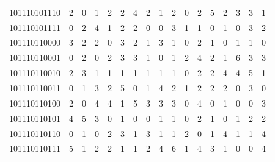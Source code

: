 \documentclass[10pt,a4paper]{article}
\begin{document}
\begin{longtable}{ |c|c|c|c|c|c|c|c|c|c|c|c|c|c|c|c|c| }
    101110101110              & 2                            & 0                                & 1                            & 2                              & 2   & 4   & 2   & 1   & 2   & 0   & 2   & 5   & 2   & 3   & 3   & 1   \\
    101110101111              & 0                            & 2                                & 4                            & 1                              & 2   & 2   & 0   & 0   & 3   & 1   & 1   & 0   & 1   & 0   & 3   & 2   \\
    101110110000              & 3                            & 2                                & 2                            & 0                              & 3   & 2   & 1   & 3   & 1   & 0   & 2   & 1   & 0   & 1   & 1   & 0   \\
    101110110001              & 0                            & 2                                & 0                            & 2                              & 3   & 3   & 1   & 0   & 1   & 2   & 4   & 2   & 1   & 6   & 3   & 3   \\
    101110110010              & 2                            & 3                                & 1                            & 1                              & 1   & 1   & 1   & 1   & 1   & 0   & 2   & 2   & 4   & 4   & 5   & 1   \\
    101110110011              & 0                            & 1                                & 3                            & 2                              & 5   & 0   & 1   & 4   & 2   & 1   & 2   & 2   & 2   & 0   & 3   & 0   \\
    101110110100              & 2                            & 0                                & 4                            & 4                              & 1   & 5   & 3   & 3   & 3   & 0   & 4   & 0   & 1   & 0   & 0   & 3   \\
    101110110101              & 4                            & 5                                & 3                            & 0                              & 1   & 0   & 0   & 1   & 1   & 0   & 2   & 1   & 0   & 1   & 2   & 2   \\
    101110110110              & 0                            & 1                                & 0                            & 2                              & 3   & 1   & 3   & 1   & 1   & 2   & 0   & 1   & 4   & 1   & 1   & 4   \\
    101110110111              & 5                            & 1                                & 2                            & 2                              & 1   & 1   & 2   & 4   & 6   & 1   & 4   & 3   & 1   & 0   & 0   & 4   \\

\end{longtable}
\end{document}

